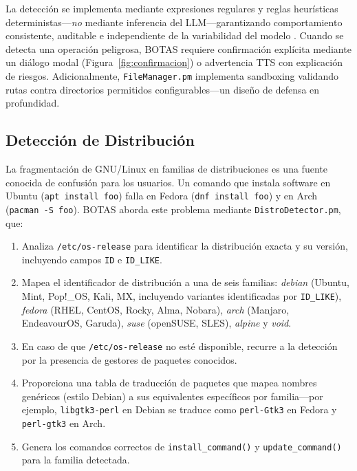 \documentclass[10pt,a4paper]{article}
\begin{document}
La detecci\'{o}n se implementa mediante expresiones regulares y reglas heur\'{i}sticas deterministas---\emph{no} mediante inferencia del LLM---garantizando comportamiento consistente, auditable e independiente de la variabilidad del modelo \citep{Amodei2016}. Cuando se detecta una operaci\'{o}n peligrosa, BOTAS requiere confirmaci\'{o}n expl\'{i}cita mediante un di\'{a}logo modal (Figura~\ref{fig:confirmacion}) o advertencia TTS con explicaci\'{o}n de riesgos. Adicionalmente, \texttt{FileManager.pm} implementa sandboxing validando rutas contra directorios permitidos configurables---un dise\~{n}o de defensa en profundidad.

\subsection{Detecci\'{o}n de Distribuci\'{o}n}
\label{subsec:distro-detect}

La fragmentaci\'{o}n de GNU/Linux en familias de distribuciones es una fuente conocida de confusi\'{o}n para los usuarios. Un comando que instala software en Ubuntu (\texttt{apt install foo}) falla en Fedora (\texttt{dnf install foo}) y en Arch (\texttt{pacman -S foo}). BOTAS aborda este problema mediante \texttt{DistroDetector.pm}, que:

\begin{enumerate}[noitemsep,topsep=0pt]
    \item Analiza \texttt{/etc/os-release} para identificar la distribuci\'{o}n exacta y su versi\'{o}n, incluyendo campos \texttt{ID} e \texttt{ID\_LIKE}.
    \item Mapea el identificador de distribuci\'{o}n a una de seis familias: \textit{debian} (Ubuntu, Mint, Pop!\_OS, Kali, MX, incluyendo variantes identificadas por \texttt{ID\_LIKE}), \textit{fedora} (RHEL, CentOS, Rocky, Alma, Nobara), \textit{arch} (Manjaro, EndeavourOS, Garuda), \textit{suse} (openSUSE, SLES), \textit{alpine} y \textit{void}.
    \item En caso de que \texttt{/etc/os-release} no est\'{e} disponible, recurre a la detecci\'{o}n por la presencia de gestores de paquetes conocidos.
    \item Proporciona una tabla de traducci\'{o}n de paquetes que mapea nombres gen\'{e}ricos (estilo Debian) a sus equivalentes espec\'{i}ficos por familia---por ejemplo, \texttt{libgtk3-perl} en Debian se traduce como \texttt{perl-Gtk3} en Fedora y \texttt{perl-gtk3} en Arch.
    \item Genera los comandos correctos de \texttt{install\_command()} y \texttt{update\_command()} para la familia detectada.
\end{enumerate}
\end{document}
